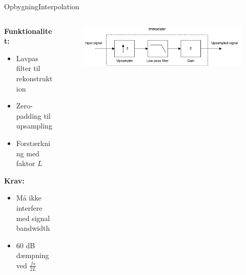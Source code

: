 \begin{frame}{Opbygning}{Interpolation}

\begin{columns}
  \begin{column}{0.4\textwidth}
  \textbf{Funktionalitet:}
\begin{itemize}
\item Lavpas filter til rekonstruktion
\item Zero-padding til upsampling
\item Forstærkning med faktor $L$
\end{itemize}
\textbf{Krav:}
\begin{itemize}
\item Må ikke interfere med signal bandwidth
\item 60 dB dæmpning ved $\frac{fs}{2L}$
\end{itemize}
  \end{column}

  \begin{column}{0.6\textwidth}
\begin{figure}
\centering
\includegraphics[width=\textwidth]{designRealInterpolator}
\end{figure}


  \end{column}
\end{columns}

\end{frame}

